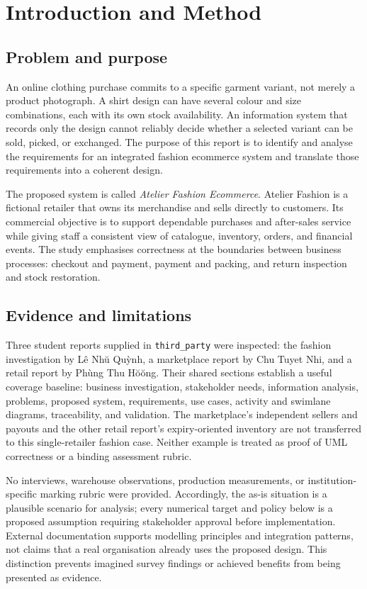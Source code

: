 \chapter{Introduction and Method}
\section{Problem and purpose}
An online clothing purchase commits to a specific garment variant, not merely a product photograph. A shirt design can have several colour and size combinations, each with its own stock availability. An information system that records only the design cannot reliably decide whether a selected variant can be sold, picked, or exchanged. The purpose of this report is to identify and analyse the requirements for an integrated fashion ecommerce system and translate those requirements into a coherent design.

The proposed system is called \emph{Atelier Fashion Ecommerce}. Atelier Fashion is a fictional retailer that owns its merchandise and sells directly to customers. Its commercial objective is to support dependable purchases and after-sales service while giving staff a consistent view of catalogue, inventory, orders, and financial events. The study emphasises correctness at the boundaries between business processes: checkout and payment, payment and packing, and return inspection and stock restoration.

\section{Evidence and limitations}
Three student reports supplied in \texttt{third\_party} were inspected: the fashion investigation by L\^e Nh\u{u} Qu\`ynh, a marketplace report by Chu Tuyet Nhi, and a retail report by Ph\`ung Thu H\u{o}\u{o}ng. Their shared sections establish a useful coverage baseline: business investigation, stakeholder needs, information analysis, problems, proposed system, requirements, use cases, activity and swimlane diagrams, traceability, and validation. The marketplace's independent sellers and payouts and the other retail report's expiry-oriented inventory are not transferred to this single-retailer fashion case. Neither example is treated as proof of UML correctness or a binding assessment rubric.

No interviews, warehouse observations, production measurements, or institution-specific marking rubric were provided. Accordingly, the as-is situation is a plausible scenario for analysis; every numerical target and policy below is a proposed assumption requiring stakeholder approval before implementation. External documentation supports modelling principles and integration patterns, not claims that a real organisation already uses the proposed design. This distinction prevents imagined survey findings or achieved benefits from being presented as evidence.


